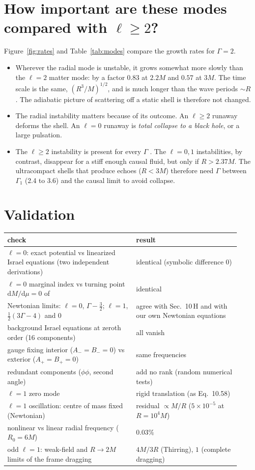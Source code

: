 \documentclass[10.5pt,a4paper]{article}
\newcommand{\dd}{\mathrm{d}}
\begin{document}
\section{How important are these modes compared with $\ell\ge2$?}
Figure~\ref{fig:rates} and Table~\ref{tab:modes} compare the growth rates for $\Gamma=2$.
\begin{itemize}
\item Wherever the radial mode is unstable, it grows somewhat more slowly than the $\ell=2$ matter mode: by a factor
$0.83$ at $2.2M$ and $0.57$ at $3M$. The time scale is the same, $(R^3/M)^{1/2}$, and is much longer than the wave periods
$\sim R$. The adiabatic picture of scattering off a static shell is therefore not changed.
\item The radial instability matters because of its outcome. An $\ell\ge2$ runaway deforms the shell. An $\ell=0$ runaway
is \emph{total collapse to a black hole}, or a large pulsation.
\item The $\ell\ge2$ instability is present for every $\Gamma$ \cite{PSP26}. The $\ell=0,1$ instabilities, by contrast,
disappear for a stiff enough causal fluid, but only if $R>2.37M$. The ultracompact shells that produce echoes
($R<3M$) therefore need $\Gamma$ between $\Gamma_1$ (2.4 to 3.6) and the causal limit to avoid collapse.
\end{itemize}

\section{Validation}
\begin{center}\small
\begin{tabular}{p{0.52\linewidth}p{0.42\linewidth}}\toprule
check & result\\\midrule
$\ell=0$: exact potential vs linearized Israel equations (two independent derivations) & identical (symbolic difference $0$)\\
$\ell=0$ marginal index vs turning point $\dd M/\dd\mu=0$ of \cite{PSP26,LP19} & identical\\
Newtonian limits: $\ell=0$, $\Gamma-\tfrac32$; $\ell=1$, $\tfrac12(3\Gamma-4)$ and $0$ & agree with \cite{PSP26} Sec.~10\,H and with our own Newtonian equations\\
background Israel equations at zeroth order (16 components) & all vanish\\
gauge fixing interior ($A_-=B_-=0$) vs exterior ($A_+=B_+=0$) & same frequencies\\
redundant components ($\phi\phi$, second angle) & add no rank (random numerical tests)\\
$\ell=1$ zero mode & rigid translation (as \cite{PSP26} Eq.~10.58)\\
$\ell=1$ oscillation: centre of mass fixed (Newtonian) & residual $\propto M/R$ ($5\times10^{-5}$ at $R=10^4M$)\\
nonlinear vs linear radial frequency ($R_0=6M$) & $0.03\%$\\
odd $\ell=1$: weak-field and $R\to2M$ limits of the frame dragging & $4M/3R$ (Thirring), $1$ (complete dragging)\\\bottomrule
\end{tabular}
\end{center}
\end{document}
